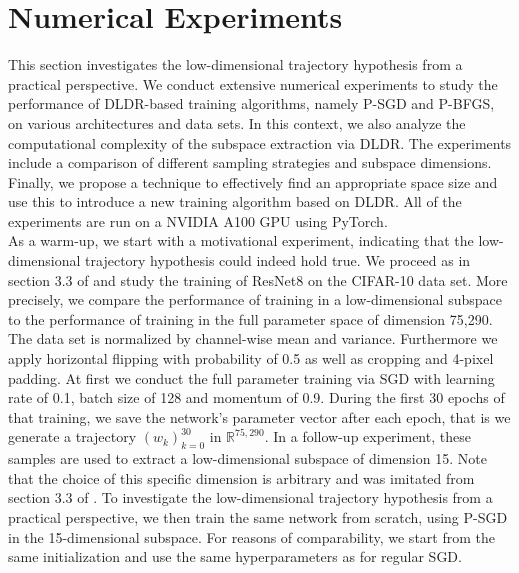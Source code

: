 \documentclass[11pt, a4paper]{article}
\newcommand{\R}{\mathbb{R}}
\begin{document}
\pagebreak
\section{Numerical Experiments} \label{sec:Experiments}

This section investigates the low-dimensional trajectory hypothesis from a practical perspective. We conduct extensive numerical experiments to study the performance of DLDR-based training algorithms, namely P-SGD and P-BFGS, on various architectures and data sets. In this context, we also analyze the computational complexity of the subspace extraction via DLDR. The experiments include a comparison of different sampling strategies and subspace dimensions. Finally, we propose a technique to effectively find an appropriate space size and use this to introduce a new training algorithm based on DLDR. All of the experiments are run on a NVIDIA A100 GPU using PyTorch. \\

As a warm-up, we start with a motivational experiment, indicating that the low-dimensional trajectory hypothesis could indeed hold true. We proceed as in section 3.3 of \cite{Paper} and study the training of ResNet8 \cite{ResNet} on the CIFAR-10 data set. More precisely, we compare the performance of training in a low-dimensional subspace to the performance of training in the full parameter space of dimension 75,290. The data set is normalized by channel-wise mean and variance. Furthermore we apply horizontal flipping with probability of 0.5 as well as cropping and 4-pixel padding. At first we conduct the full parameter training via SGD with learning rate of 0.1, batch size of 128 and momentum of 0.9. During the first 30 epochs of that training, we save the network's parameter vector after each epoch, that is we generate a trajectory $(w_k)_{k=0}^{30}$ in $\R^{75,290}$. In a follow-up experiment, these samples are used to extract a low-dimensional subspace of dimension 15. Note that the choice of this specific dimension is arbitrary and was imitated from section 3.3 of \cite{Paper}. To investigate the low-dimensional trajectory hypothesis from a practical perspective, we then train the same network from scratch, using P-SGD in the 15-dimensional subspace. For reasons of comparability, we start from the same initialization and use the same hyperparameters as for regular SGD.
\end{document}
